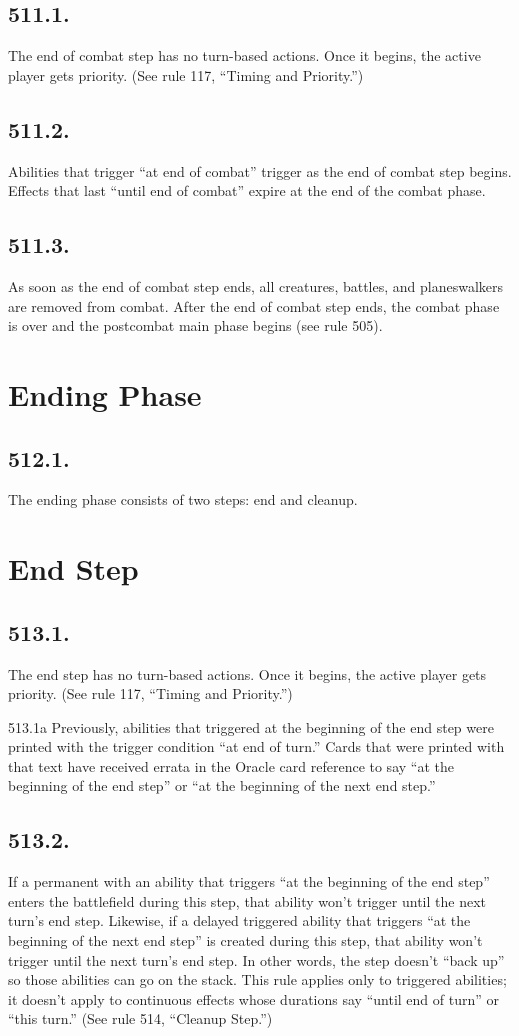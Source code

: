 \subsection*{511.1.}
The end of combat step has no turn-based actions. Once it begins, the active player gets priority. (See rule 117, “Timing and Priority.”)

\subsection*{511.2.}
Abilities that trigger “at end of combat” trigger as the end of combat step begins. Effects that last “until end of combat” expire at the end of the combat phase.

\subsection*{511.3.}
As soon as the end of combat step ends, all creatures, battles, and planeswalkers are removed from combat. After the end of combat step ends, the combat phase is over and the postcombat main phase begins (see rule 505).

\section{Ending Phase}
\subsection*{512.1.}
The ending phase consists of two steps: end and cleanup.

\section{End Step}
\subsection*{513.1.}
The end step has no turn-based actions. Once it begins, the active player gets priority. (See rule 117, “Timing and Priority.”)

513.1a Previously, abilities that triggered at the beginning of the end step were printed with the trigger condition “at end of turn.” Cards that were printed with that text have received errata in the Oracle card reference to say “at the beginning of the end step” or “at the beginning of the next end step.”

\subsection*{513.2.}
If a permanent with an ability that triggers “at the beginning of the end step” enters the battlefield during this step, that ability won’t trigger until the next turn’s end step. Likewise, if a delayed triggered ability that triggers “at the beginning of the next end step” is created during this step, that ability won’t trigger until the next turn’s end step. In other words, the step doesn’t “back up” so those abilities can go on the stack. This rule applies only to triggered abilities; it doesn’t apply to continuous effects whose durations say “until end of turn” or “this turn.” (See rule 514, “Cleanup Step.”)

